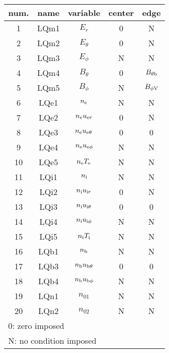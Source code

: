 \documentclass[11pt]{article}
\def\r#1{{\rm#1}}
\def\ne{n_\r{e}}
\def\ni{n_\r{i}}
\def\nb{n_\r{b}}
\def\uer{u_{\r{e}r}}
\def\uir{u_{\r{i}r}}
\def\ueth{u_{\r{e}\theta}}
\def\uith{u_{\r{i}\theta}}
\def\ubth{u_{\r{b}\theta}}
\def\ueph{u_{\r{e}\phi}}
\def\uiph{u_{\r{i}\phi}}
\def\ubph{u_{\r{b}\phi}}
\def\Er{E_r}
\def\Eth{E_\theta}
\def\Eph{E_\phi}
\def\Bth{B_\theta}
\def\Bph{B_\phi}
\def\Te{T_\r{e}}
\def\Ti{T_\r{i}}
\def\nna{n_{01}}
\def\nnb{n_{02}}
\begin{document}
\begin{tabular}{|c|c|c|c|c|}\hline
 num. & name & variable     & center & edge \\\hline
 1    & LQm1 & $\Er$        & 0      & N\\
 2    & LQm2 & $\Eth$       & 0      & N\\
 3    & LQm3 & $\Eph$       & N      & N\\
 4    & LQm4 & $\Bth$       & 0      & $B_{\theta \r{b}}$\\
 5    & LQm5 & $\Bph$       & N      & $B_{\phi \r{V}}$\\
 6    & LQe1 & $\ne$        & N      & N\\
 7    & LQe2 & $\ne \uer$   & 0      & N\\
 8    & LQe3 & $\ne \ueth$  & 0      & 0\\
 9    & LQe4 & $\ne \ueph$  & N      & N\\
 10   & LQe5 & $\ne \Te$    & N      & N\\
 11   & LQi1 & $\ni$        & N      & N\\
 12   & LQi2 & $\ni \uir$   & 0      & N\\
 13   & LQi3 & $\ni \uith$  & 0      & 0\\
 14   & LQi4 & $\ni \uiph$  & N      & N\\
 15   & LQi5 & $\ni \Ti$    & N      & N\\
 16   & LQb1 & $\nb$        & N      & N\\
 17   & LQb3 & $\nb \ubth$  & 0      & 0\\
 18   & LQb4 & $\nb \ubph$  & N      & N\\
 19   & LQn1 & $\nna$       & N      & N\\
 20   & LQn2 & $\nnb$       & N      & N\\\hline
 \multicolumn{5}{l}{0: zero imposed}\\
 \multicolumn{5}{l}{N: no condition imposed}
\end{tabular}
\end{document}
